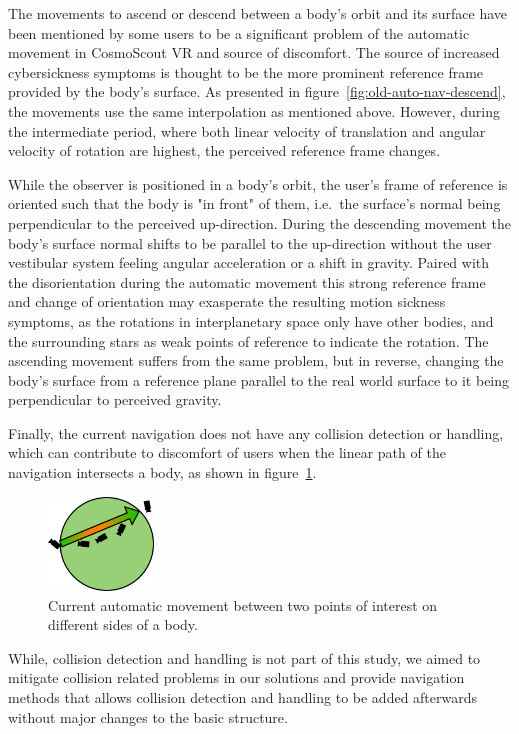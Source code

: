 The movements to ascend or descend between a body's orbit and its surface have been mentioned by some users to be a
significant problem of the automatic movement in CosmoScout VR and source of discomfort.
The source of increased cybersickness symptoms is thought to be the more prominent reference frame provided by the
body's surface.
As presented in figure~\ref{fig:old-auto-nav-descend}, the movements use the same interpolation as mentioned above.
However, during the intermediate period, where both linear velocity of translation and angular velocity of rotation
are highest, the perceived reference frame changes.

While the observer is positioned in a body's orbit, the user's frame of reference is oriented such that the body is
"in front" of them, i.e.\ the surface's normal being perpendicular to the perceived up-direction.
During the descending movement the body's surface normal shifts to be parallel to the up-direction without the user
vestibular system feeling angular acceleration or a shift in gravity.
Paired with the disorientation during the automatic movement this strong reference frame and change of orientation may
exasperate the resulting motion sickness symptoms, as the rotations in interplanetary space only have other bodies,
and the surrounding stars as weak points of reference to indicate the rotation.
The ascending movement suffers from the same problem, but in reverse, changing the body's surface from a reference
plane parallel to the real world surface to it being perpendicular to perceived gravity.

Finally, the current navigation does not have any collision detection or handling, which can contribute to discomfort
of users when the linear path of the navigation intersects a body, as shown in figure~\ref{fig:old-auto-nav-collision}.

\begin{figure}[h]
    \centering
    \includegraphics[width=0.25\textwidth]{content/3_current_state/img/OldAutomaticNavigation_SurfaceCollision}
    \caption{Current automatic movement between two points of interest on different sides of a body.}
    \label{fig:old-auto-nav-collision}
\end{figure}

While, collision detection and handling is not part of this study, we aimed to mitigate collision related problems in
our solutions and provide navigation methods that allows collision detection and handling to be added afterwards
without major changes to the basic structure.
